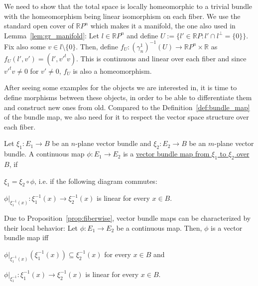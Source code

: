 \begin{examples}
\begin{i_enum}
We need to show that the total space is locally homeomorphic to a trivial bundle with the homeomorphism being linear isomorphism on each fiber. We use the standard open cover of $\mathbb{R}P^n$ which makes it a manifold, the one also used in Lemma~\ref{lem:gr_manifold}: Let $l\in\mathbb{R}P^n$ and define $U:=\{l'\in\mathbb{R}P:l'\cap l^{\perp}=\{0\}\}$. Fix also some $v\in l\setminus\{0\}$. Then, define $f_U:(\gamma_n^1)^{-1}(U)\to\mathbb{R}P^n\times\mathbb{R}$ as
$f_U(l',v')=(l',v'^tv)$.
This is continuous and linear over each fiber and since $v'^tv\neq0$ for $v'\neq0$, $f_U$ is also a homeomorphism.
\end{i_enum}
\end{examples}

After seeing some examples for the objects we are interested in, it is time to define morphisms between these objects, in order to be able to differentiate them and construct new ones from old. Compared to the Definition~\ref{def:bundle_map} of the bundle map, we also need for it to respect the vector space structure over each fiber.

\begin{definition}
Let $\xi_1:E_1\to B$ be an $n$-plane vector bundle and $\xi_2:E_2\to B$ be an $m$-plane vector bundle. A continuous map $\phi:E_1\to E_2$ is a \ul{vector bundle map from $\xi_1$ to $\xi_2$ over $B$}, if
\begin{i_enum}
\item $\xi_1=\xi_2\circ\phi$, i.e. if the following diagram commutes:
\begin{center}
\end{center}
\item $\phi|_{\xi_1^{-1}(x)}:\xi_1^{-1}(x)\to\xi_2^{-1}(x)$ is linear for every $x\in B$.
\end{i_enum}
\end{definition}
\begin{remark} Due to Proposition~\ref{prop:fiberwise}, vector bundle maps can be characterized by their local behavior: Let $\phi:E_1\to E_2$ be a continuous map. Then, $\phi$ is a vector bundle map iff
\begin{i_enum}
\item $\phi|_{\xi_1^{-1}(x)}(\xi_1^{-1}(x))\subseteq\xi_2^{-1}(x)$ for every $x\in B$ and
\item $\phi|_{\xi_1^{-1}}:\xi_1^{-1}(x)\to\xi_2^{-1}(x)$ is linear for every $x\in B$.
\end{i_enum}
\end{remark}


